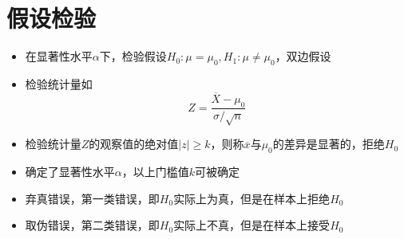 \documentclass[UTF8]{ctexart}
\begin{document}
\section{假设检验}
\begin{itemize}

	\item 在显著性水平$\alpha$下，检验假设$H_0:\mu = \mu_0,H_1:\mu \neq \mu_0$，双边假设

	\item 检验统计量如
	\[
		Z=\frac{\overline{X}-\mu_0}{\sigma/\sqrt{n}}
	\]
	\item 检验统计量$Z$的观察值的绝对值$|z|\geq k$，则称$\overline{x}$与$\mu_0$的差异是显著的，拒绝$H_0$

	\item 确定了显著性水平$\alpha$，以上门槛值$k$可被确定

	\item 弃真错误，第一类错误，即$H_0$实际上为真，但是在样本上拒绝$H_0$

	\item 取伪错误，第二类错误，即$H_0$实际上不真，但是在样本上接受$H_0$
\end{itemize}
\end{document}

